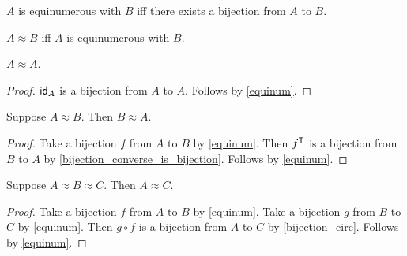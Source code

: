 




\begin{definition}\label{equinum}
    $A$ is equinumerous with $B$ iff there exists a bijection from $A$ to $B$.
\end{definition}

\begin{abbreviation}\label{approx}
    $A\approx B$ iff $A$ is equinumerous with $B$.
\end{abbreviation}

\begin{proposition}\label{equinum_refl}
    $A\approx A$.
\end{proposition}
\begin{proof}
    $\operatorname{\mathsf{id}}_{A}$ is a bijection from $A$ to $A$. %
    Follows by \cref{equinum}.
\end{proof}

\begin{proposition}\label{equinum_sym}
    Suppose $A\approx B$. Then $B\approx A$.
\end{proposition}
\begin{proof}
    Take a bijection $f$ from $A$ to $B$ by \cref{equinum}.
    Then ${f^{\mathsf{T}}}$ is a bijection from $B$ to $A$ by \cref{bijection_converse_is_bijection}.
    Follows by \cref{equinum}.
\end{proof}

\begin{proposition}\label{equinum_tran}
    Suppose $A\approx B\approx C$. Then $A\approx C$.
\end{proposition}
\begin{proof}
    Take a bijection $f$ from $A$ to $B$ by \cref{equinum}.
    Take a bijection $g$ from $B$ to $C$ by \cref{equinum}.
    Then $g\circ f$ is a bijection from $A$ to $C$ by \cref{bijection_circ}.
    Follows by \cref{equinum}.
\end{proof}



